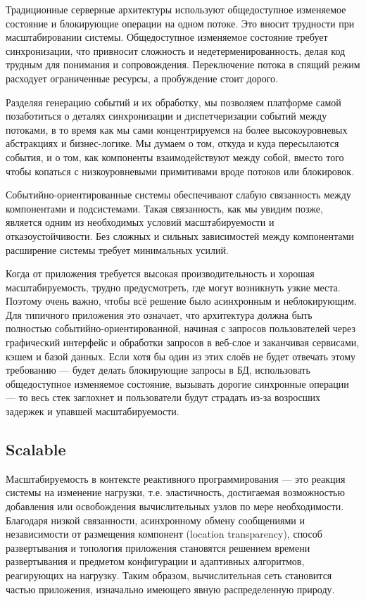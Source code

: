 Традиционные серверные архитектуры используют общедоступное изменяемое состояние и блокирующие операции на одном потоке. Это вносит трудности при масштабировании системы. Общедоступное изменяемое состояние требует синхронизации, что привносит сложность и недетерменированность, делая код трудным для понимания и сопровождения. Переключение потока в спящий режим расходует ограниченные ресурсы, а пробуждение стоит дорого.

Разделяя генерацию событий и их обработку, мы позволяем платформе самой позаботиться о деталях синхронизации и диспетчеризации событий между потоками, в то время как мы сами концентрируемся на более высокоуровневых абстракциях и бизнес-логике. Мы думаем о том, откуда и куда пересылаются события, и о том, как компоненты взаимодействуют между собой, вместо того чтобы копаться с низкоуровневыми примитивами вроде потоков или блокировок.

Событийно-ориентированные системы обеспечивают слабую связанность между компонентами и подсистемами. Такая связанность, как мы увидим позже, является одним из необходимых условий масштабируемости и отказоустойчивости. Без сложных и сильных зависимостей между компонентами расширение системы требует минимальных усилий.

Когда от приложения требуется высокая производительность и хорошая масштабируемость, трудно предусмотреть, где могут возникнуть узкие места. Поэтому очень важно, чтобы всё решение было асинхронным и неблокирующим. Для типичного приложения это означает, что архитектура должна быть полностью событийно-ориентированной, начиная с запросов пользователей через графический интерфейс и обработки запросов в веб-слое и заканчивая сервисами, кэшем и базой данных. Если хотя бы один из этих слоёв не будет отвечать этому требованию --- будет делать блокирующие запросы в БД, использовать общедоступное изменяемое состояние, вызывать дорогие синхронные операции --- то весь стек заглохнет и пользователи будут страдать из-за возросших задержек и упавшей масштабируемости.

\subsection{Scalable}
\label{subsub:domain:reactive_programming:scalable}

Масштабируемость в контексте реактивного программирования --- это реакция системы на изменение нагрузки, т.е. эластичность, достигаемая возможностью добавления или освобождения вычислительных узлов по мере необходимости. Благодаря низкой связанности, асинхронному обмену сообщениями и независимости от размещения компонент (location transparency), способ развертывания и топология приложения становятся решением времени развертывания и предметом конфигурации и адаптивных алгоритмов, реагирующих на нагрузку. Таким образом, вычислительная сеть становится частью приложения, изначально имеющего явную распределенную природу.

